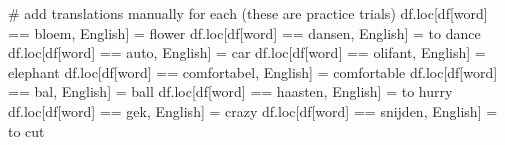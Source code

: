 \documentclass[
  letterpaper,
  DIV=11,
  numbers=noendperiod]{scrreprt}
\newenvironment{Shaded}{\begin{snugshade}}{\end{snugshade}}
\newcommand{\CommentTok}[1]{\textcolor[rgb]{0.37,0.37,0.37}{#1}}
\newcommand{\NormalTok}[1]{\textcolor[rgb]{0.00,0.23,0.31}{#1}}
\newcommand{\OperatorTok}[1]{\textcolor[rgb]{0.37,0.37,0.37}{#1}}
\newcommand{\StringTok}[1]{\textcolor[rgb]{0.13,0.47,0.30}{#1}}
\begin{document}
\begin{Shaded}
\begin{Highlighting}[]
\CommentTok{\# add translations manually for each (these are practice trials)}
\NormalTok{df.loc[df[}\StringTok{\textquotesingle{}word\textquotesingle{}}\NormalTok{] }\OperatorTok{==} \StringTok{\textquotesingle{}bloem\textquotesingle{}}\NormalTok{, }\StringTok{\textquotesingle{}English\textquotesingle{}}\NormalTok{] }\OperatorTok{=} \StringTok{\textquotesingle{}flower\textquotesingle{}}
\NormalTok{df.loc[df[}\StringTok{\textquotesingle{}word\textquotesingle{}}\NormalTok{] }\OperatorTok{==} \StringTok{\textquotesingle{}dansen\textquotesingle{}}\NormalTok{, }\StringTok{\textquotesingle{}English\textquotesingle{}}\NormalTok{] }\OperatorTok{=} \StringTok{\textquotesingle{}to dance\textquotesingle{}}
\NormalTok{df.loc[df[}\StringTok{\textquotesingle{}word\textquotesingle{}}\NormalTok{] }\OperatorTok{==} \StringTok{\textquotesingle{}auto\textquotesingle{}}\NormalTok{, }\StringTok{\textquotesingle{}English\textquotesingle{}}\NormalTok{] }\OperatorTok{=} \StringTok{\textquotesingle{}car\textquotesingle{}}
\NormalTok{df.loc[df[}\StringTok{\textquotesingle{}word\textquotesingle{}}\NormalTok{] }\OperatorTok{==} \StringTok{\textquotesingle{}olifant\textquotesingle{}}\NormalTok{, }\StringTok{\textquotesingle{}English\textquotesingle{}}\NormalTok{] }\OperatorTok{=} \StringTok{\textquotesingle{}elephant\textquotesingle{}}
\NormalTok{df.loc[df[}\StringTok{\textquotesingle{}word\textquotesingle{}}\NormalTok{] }\OperatorTok{==} \StringTok{\textquotesingle{}comfortabel\textquotesingle{}}\NormalTok{, }\StringTok{\textquotesingle{}English\textquotesingle{}}\NormalTok{] }\OperatorTok{=} \StringTok{\textquotesingle{}comfortable\textquotesingle{}}
\NormalTok{df.loc[df[}\StringTok{\textquotesingle{}word\textquotesingle{}}\NormalTok{] }\OperatorTok{==} \StringTok{\textquotesingle{}bal\textquotesingle{}}\NormalTok{, }\StringTok{\textquotesingle{}English\textquotesingle{}}\NormalTok{] }\OperatorTok{=} \StringTok{\textquotesingle{}ball\textquotesingle{}}
\NormalTok{df.loc[df[}\StringTok{\textquotesingle{}word\textquotesingle{}}\NormalTok{] }\OperatorTok{==} \StringTok{\textquotesingle{}haasten\textquotesingle{}}\NormalTok{, }\StringTok{\textquotesingle{}English\textquotesingle{}}\NormalTok{] }\OperatorTok{=} \StringTok{\textquotesingle{}to hurry\textquotesingle{}}
\NormalTok{df.loc[df[}\StringTok{\textquotesingle{}word\textquotesingle{}}\NormalTok{] }\OperatorTok{==} \StringTok{\textquotesingle{}gek\textquotesingle{}}\NormalTok{, }\StringTok{\textquotesingle{}English\textquotesingle{}}\NormalTok{] }\OperatorTok{=} \StringTok{\textquotesingle{}crazy\textquotesingle{}}
\NormalTok{df.loc[df[}\StringTok{\textquotesingle{}word\textquotesingle{}}\NormalTok{] }\OperatorTok{==} \StringTok{\textquotesingle{}snijden\textquotesingle{}}\NormalTok{, }\StringTok{\textquotesingle{}English\textquotesingle{}}\NormalTok{] }\OperatorTok{=} \StringTok{\textquotesingle{}to cut\textquotesingle{}}

\end{Highlighting}
\end{Shaded}
\end{document}
